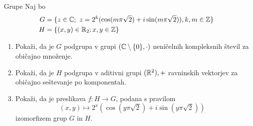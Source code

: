 \begin{frame}{Grupe}
	Naj bo
	\begin{align*}
		G &=\{z \in \mathbb{C};~z=2^k(\cos (m \pi \sqrt{2})+i \sin (m \pi \sqrt{2})), k,m \in \mathbb{Z}\} \\
		H &=\{(x,y) \in \mathbb{R}_2; x,y \in \mathbb{Z}\}
	\end{align*}
	\begin{enumerate}
		\item
			Pokaži, da je $G$ podgrupa v grupi $(\mathbb{C} \setminus \{0\}, \cdot)$
			neničelnih kompleksnih števil za običajno množenje.
		\item
			Pokaži, da je $H$ podgrupa v aditivni grupi $(\mathbb{R}^2),+$
			ravninskih vektorjev za običajno seštevanje po komponentah.
		\item
			Pokaži, da je preslikava $f:H\to G$, podana s pravilom
			$$(x,y)\mapsto 2^x(\cos (y \pi \sqrt{2})+i \sin (y \pi \sqrt{2}))$$
			izomorfizem grup $G$ in $H$.
	\end{enumerate}
\end{frame}